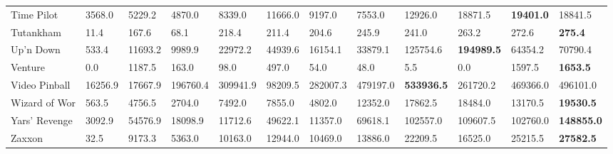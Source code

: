 \begin{tabular}{| p{2.4cm} p{0.84cm} p{0.84cm} p{0.84cm} p{0.84cm} p{0.84cm} p{0.84cm} p{0.84cm} p{0.84cm} p{0.84cm} p{0.84cm} p{0.84cm} |}
Time Pilot & 3568.0 & 5229.2 & 4870.0 & 8339.0 & 11666.0 & 9197.0 & 7553.0 & 12926.0 & 18871.5 & {\bf 19401.0} & 18841.5\\
Tutankham & 11.4 & 167.6 & 68.1 & 218.4 & 211.4 & 204.6 & 245.9 & 241.0 & 263.2 & 272.6 & {\bf 275.4}\\
Up'n Down & 533.4 & 11693.2 & 9989.9 & 22972.2 & 44939.6 & 16154.1 & 33879.1 & 125754.6 & {\bf 194989.5} & 64354.2 & 70790.4\\
Venture & 0.0 & 1187.5 & 163.0 & 98.0 & 497.0 & 54.0 & 48.0 & 5.5 & 0.0 & 1597.5 & {\bf 1653.5}\\
Video Pinball & 16256.9 & 17667.9 & 196760.4 & 309941.9 & 98209.5 & 282007.3 & 479197.0 & {\bf 533936.5} & 261720.2 & 469366.0 & 496101.0\\
Wizard of Wor & 563.5 & 4756.5 & 2704.0 & 7492.0 & 7855.0 & 4802.0 & 12352.0 & 17862.5 & 18484.0 & 13170.5 & {\bf 19530.5}\\
Yars' Revenge & 3092.9 & 54576.9 & 18098.9 & 11712.6 & 49622.1 & 11357.0 & 69618.1 & 102557.0 & 109607.5 & 102760.0 & {\bf 148855.0}\\
Zaxxon & 32.5 & 9173.3 & 5363.0 & 10163.0 & 12944.0 & 10469.0 & 13886.0 & 22209.5 & 16525.0 & 25215.5 & {\bf 27582.5}\\
\hline
\end{tabular}
